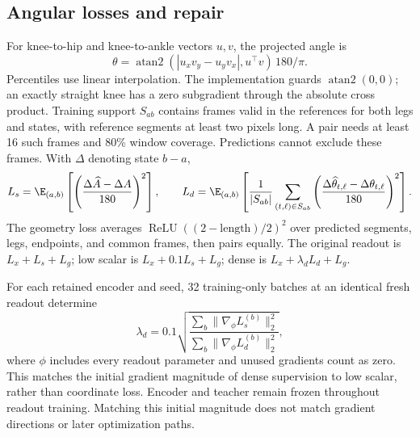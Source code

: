 \subsection{Angular losses and repair}
For knee-to-hip and knee-to-ankle vectors $u,v$, the projected angle is
\begin{equation}
\theta=\operatorname{atan2}(|u_xv_y-u_yv_x|,u^\top v)\,180/\pi.
\end{equation}
Percentiles use linear interpolation. The implementation guards $\operatorname{atan2}(0,0)$; an exactly straight knee has a zero subgradient through the absolute cross product. Training support $S_{ab}$ contains frames valid in the references for both legs and states, with reference segments at least two pixels long. A pair needs at least 16 such frames and 80\% window coverage. Predictions cannot exclude these frames. With $\Delta$ denoting state $b-a$,
\begin{equation}
L_s=\E_{(a,b)}\left[\left(\frac{\Delta\widehat A-\Delta A}{180}\right)^2\right],\qquad
L_d=\E_{(a,b)}\left[\frac{1}{|S_{ab}|}\sum_{(t,\ell)\in S_{ab}}
\left(\frac{\Delta\widehat\theta_{t,\ell}-\Delta\theta_{t,\ell}}{180}\right)^2\right].
\end{equation}
The geometry loss averages $\operatorname{ReLU}((2-\text{length})/2)^2$ over predicted segments, legs, endpoints, and common frames, then pairs equally. The original readout is $L_x+L_s+L_g$; low scalar is $L_x+0.1L_s+L_g$; dense is $L_x+\lambda_dL_d+L_g$.

For each retained encoder and seed, 32 training-only batches at an identical fresh readout determine
\begin{equation}
\lambda_d=0.1\sqrt{\frac{\sum_b\|\nabla_\phi L_s^{(b)}\|_2^2}{\sum_b\|\nabla_\phi L_d^{(b)}\|_2^2}},
\end{equation}
where $\phi$ includes every readout parameter and unused gradients count as zero. This matches the initial gradient magnitude of dense supervision to low scalar, rather than coordinate loss. Encoder and teacher remain frozen throughout readout training. Matching this initial magnitude does not match gradient directions or later optimization paths.

